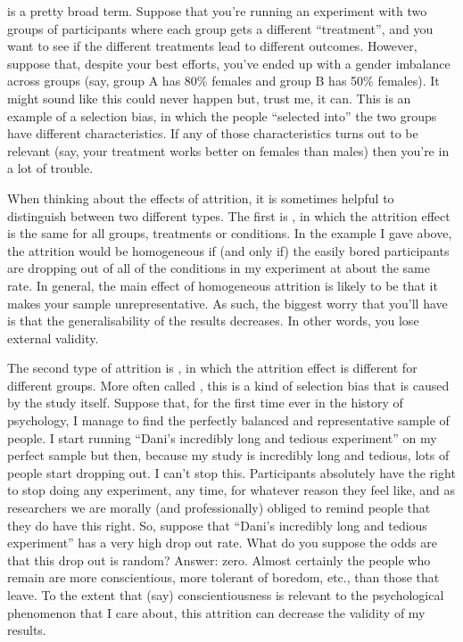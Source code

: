 
 is a pretty broad term. Suppose that you're running an experiment with two groups of participants where each group gets a different ``treatment'', and you want to see if the different treatments lead to different outcomes. However, suppose that, despite your best efforts, you've ended up with a gender imbalance across groups (say, group A has 80\% females and group B has 50\% females). It might sound like this could never happen but, trust me, it can. This is an example of a selection bias, in which the people ``selected into'' the two groups have different characteristics. If any of those characteristics turns out to be relevant (say, your treatment works better on females than males) then you're in a lot of trouble. 


When thinking about the effects of attrition, it is sometimes helpful to distinguish between two different types. The first is , in which the attrition effect is the same for all groups, treatments or conditions. In the example I gave above, the attrition would be homogeneous if (and only if) the easily bored participants are dropping out of all of the conditions in my experiment at about the same rate. In general, the main effect of homogeneous attrition is likely to be that it makes your sample unrepresentative. As such, the biggest worry that you'll have is that the generalisability of the results decreases. In other words, you lose external validity.

The second type of attrition is , in which the attrition effect is different for different groups. More often called , this is a kind of selection bias that is caused by the study itself. Suppose that, for the first time ever in the history of psychology, I manage to find the perfectly balanced and representative sample of people. I start running ``Dani's incredibly long and tedious experiment'' on my perfect sample but then, because my study is incredibly long and tedious, lots of people start dropping out. I can't stop this. Participants absolutely have the right to stop doing any experiment, any time, for whatever reason they feel like, and as researchers we are morally (and professionally) obliged to remind people that they do have this right. So, suppose that ``Dani's incredibly long and tedious experiment'' has a very high drop out rate. What do you suppose the odds are that this drop out is random? Answer: zero. Almost certainly the people who remain are more conscientious, more tolerant of boredom, etc., than those that leave. To the extent that (say) conscientiousness is relevant to the psychological phenomenon that I care about, this attrition can decrease the validity of my results.

